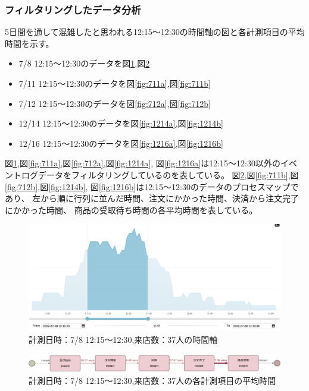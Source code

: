 \documentclass{jsarticle}
\begin{document}
\subsubsection{フィルタリングしたデータ分析}
5日間を通して混雑したと思われる12:15〜12:30の時間軸の図と各計測項目の平均時間を示す。
\begin{itemize}
\item 7/8 12:15〜12:30のデータを図\ref{fig:708a},図\ref{fig:708b}
\item 7/11 12:15〜12:30のデータを図\ref{fig:711a},図\ref{fig:711b}
\item 7/12 12:15〜12:30のデータを図\ref{fig:712a},図\ref{fig:712b}
\item 12/14 12:15〜12:30のデータを図\ref{fig:1214a},図\ref{fig:1214b}
\item 12/16 12:15〜12:30のデータを図\ref{fig:1216a},図\ref{fig:1216b}
\end{itemize}

図\ref{fig:708a},図\ref{fig:711a},図\ref{fig:712a},図\ref{fig:1214a},
図\ref{fig:1216a}は12:15〜12:30以外のイベントログデータをフィルタリングしているのを表している。
図\ref{fig:708b},図\ref{fig:711b},図\ref{fig:712b},図\ref{fig:1214b},
図\ref{fig:1216b}は12:15〜12:30のデータのプロセスマップであり、
左から順に行列に並んだ時間、注文にかかった時間、決済から注文完了にかかった時間、
商品の受取待ち時間の各平均時間を表している。

\begin{figure}[H]
  \centering
  \includegraphics[width=14cm]{708a.png}
  \caption{計測日時：7/8 12:15〜12:30,来店数：37人の時間軸}
  \label{fig:708a}
\end{figure}

\begin{figure}[H]
  \centering
  \includegraphics[width=15cm]{708b.png}
  \caption{計測日時：7/8 12:15〜12:30,来店数：37人の各計測項目の平均時間}
  \label{fig:708b}
\end{figure}
\end{document}
